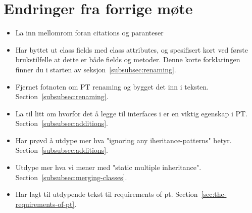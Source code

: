 
\chapter*{Endringer fra forrige møte}

\begin{itemize}
    \item La inn mellomrom foran citations og paranteser
    \item Har byttet ut class fields med class attributes, og spesifisert kort ved første brukstilfelle at dette er både fields og metoder.
    Denne korte forklaringen finner du i starten av seksjon~\vref{subsubsec:renaming}.
    \item Fjernet fotnoten om PT renaming og bygget det inn i teksten.
    Section~\vref{subsubsec:renaming}.
    \item La til litt om hvorfor det å legge til interfaces i  er en viktig egenskap i PT.
    Section~\vref{subsubsec:additions}.
    \item Har prøvd å utdype mer hva "ignoring any iheritance-patterns" betyr.
    Section~\vref{subsubsec:additions}.
    \item Utdype mer hva vi mener med "static multiple inheritance".
    Section~\vref{subsubsec:merging-classes}.
    \item Har lagt til utdypende tekst til requirements of pt.
    Section~\vref{sec:the-requirements-of-pt}.
\end{itemize}

